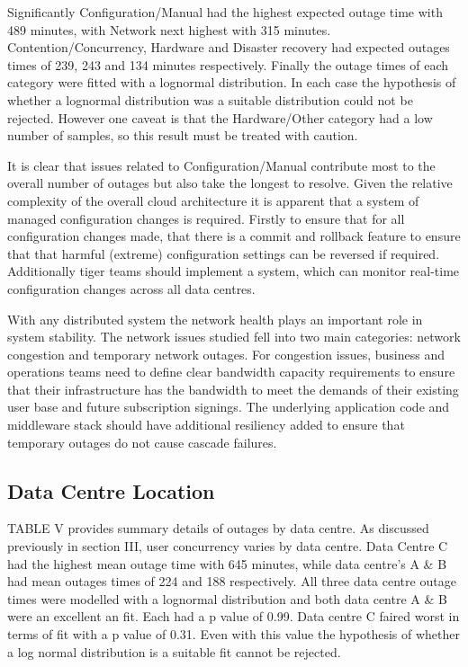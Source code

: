 \documentclass[conference]{IEEEtran}
\begin{document}
Significantly Configuration/Manual had the highest expected outage time with 489 minutes, with Network next highest with 315 minutes. Contention/Concurrency, Hardware and Disaster recovery had expected outages times of 239, 243 and 134 minutes respectively. Finally the outage times of each category were fitted with a lognormal distribution. In each case the hypothesis of whether a lognormal distribution was a suitable distribution could not be rejected. However one caveat is that the Hardware/Other category had a low number of samples, so this result must be treated with caution. \par

It is clear that issues related to Configuration/Manual contribute most to the overall number of outages but also take the longest to resolve.  Given the relative complexity of the overall cloud architecture it is apparent that a system of managed configuration changes is required. Firstly to ensure that for all configuration changes made, that there is a commit and rollback feature to ensure that that harmful (extreme) configuration settings can be reversed if required. Additionally tiger teams should implement a system, which can monitor real-time configuration changes across all data centres.  \par

With any distributed system the network health plays an important role in system stability. The network issues studied fell into two main categories: network congestion and temporary network outages. For congestion issues, business and operations teams need to define clear bandwidth capacity requirements to ensure that their infrastructure has the bandwidth to meet the demands of their existing user base and future subscription signings. The underlying application code and middleware stack should have additional resiliency added to ensure that temporary outages do not cause cascade failures.  \par

\subsection{Data Centre Location}

TABLE V provides summary details of outages by data centre. As discussed previously in section III, user concurrency varies by data centre. Data Centre C had the highest mean outage time with 645 minutes, while data centre's A \& B had mean outages times of 224 and 188 respectively. All three data centre outage times were modelled with a lognormal distribution and both data centre A \& B were an excellent an fit. Each had a  p value of 0.99. Data centre C faired worst in terms of fit with a p value of 0.31. Even with this value the hypothesis of whether a log normal distribution is a suitable fit cannot be rejected. \par
\end{document}
